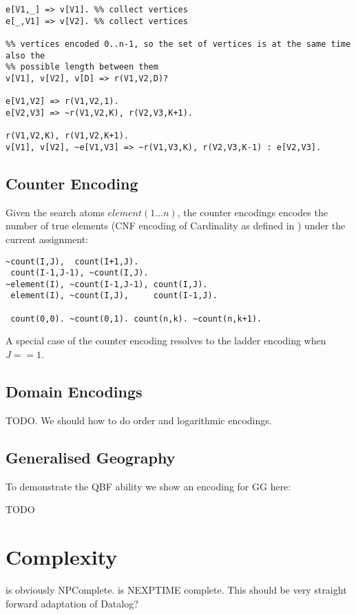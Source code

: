 \documentclass[conference]{IEEEtran}
\begin{document}
\begin{lstlisting}
e[V1,_] => v[V1]. %% collect vertices
e[_,V1] => v[V2]. %% collect vertices

%% vertices encoded 0..n-1, so the set of vertices is at the same time also the
%% possible length between them 
v[V1], v[V2], v[D] => r(V1,V2,D)?

e[V1,V2] => r(V1,V2,1). 
e[V2,V3] => ~r(V1,V2,K), r(V2,V3,K+1). 

r(V1,V2,K), r(V1,V2,K+1). 
v[V1], v[V2], ~e[V1,V3] => ~r(V1,V3,K), r(V2,V3,K-1) : e[V2,V3].
\end{lstlisting}

\subsection{Counter Encoding}

Given the search atoms $element(1\ldots n)$, the counter encodings encodes the
number of true elements (CNF encoding of Cardinality as defined in \cite{Sinz05})
under the current assignment:

\begin{lstlisting}
~count(I,J),  count(I+1,J).
 count(I-1,J-1), ~count(I,J).
~element(I), ~count(I-1,J-1), count(I,J).
 element(I), ~count(I,J),     count(I-1,J).

 count(0,0). ~count(0,1). count(n,k). ~count(n,k+1).
\end{lstlisting}

A special case of the counter encoding resolves to the ladder encoding when $J==1$. 

\subsection{Domain Encodings}

TODO. We should how to do order and logarithmic encodings. 

\subsection{Generalised Geography}

To demonstrate the QBF ability we show an encoding for GG here: 

TODO 

\section{Complexity}

\bflat is obviously NPComplete. 
\bfull is NEXPTIME complete. 
This should be very straight forward adaptation of Datalog?
\end{document}
